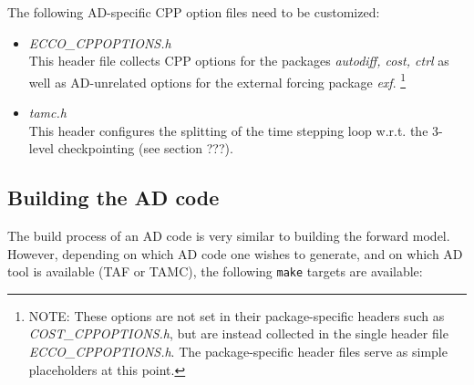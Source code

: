 The following AD-specific CPP option files need to be customized:
%
\begin{itemize}
%
\item {\it ECCO\_CPPOPTIONS.h} \\
This header file collects CPP options for the packages
{\it autodiff, cost, ctrl} as well as AD-unrelated options for
the external forcing package {\it exf}.
\footnote{NOTE: These options are not set in their package-specific 
headers such as {\it COST\_CPPOPTIONS.h}, but are instead collected
in the single header file {\it ECCO\_CPPOPTIONS.h}. 
The package-specific header files serve as simple
placeholders at this point.}
%
\item {\it tamc.h} \\
This header configures the splitting of the time stepping loop
w.r.t. the 3-level checkpointing (see section ???).

%
\end{itemize}


\subsection{Building the AD code
\label{section_ad_build}}

The build process of an AD code is very similar to building
the forward model. However, depending on which AD code one wishes
to generate, and on which AD tool is available (TAF or TAMC),
the following {\tt make} targets are available:

